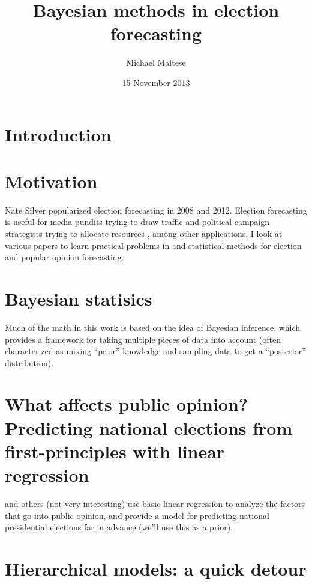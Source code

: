 \documentclass[12pt]{report}
\begin{document}
\title{\textbf{Bayesian methods in election forecasting}}
\author{Michael Maltese}
\date{15 November 2013}
\maketitle

\tableofcontents

\chapter*{Introduction}

\chapter{Motivation}

Nate Silver \citeyearpar{Silver:2012aa} popularized election forecasting in 2008 and 2012. Election forecasting is useful for media pundits trying to draw traffic and political campaign strategists trying to allocate resources \citep{Strauss:2007aa}, among other applications. I look at various papers to learn practical problems in and statistical methods for election and popular opinion forecasting.

\chapter{Bayesian statisics}

Much of the math in this work is based on the idea of Bayesian inference, which provides a framework for taking multiple pieces of data into account (often characterized as mixing ``prior'' knowledge and sampling data to get a ``posterior'' distribution).

\chapter{What affects public opinion? Predicting national elections from first-principles with linear regression}

\cite{Hibbs:2008aa} and others (not very interesting) use basic linear regression to analyze the factors that go into public opinion, and provide a model for predicting national presidential elections far in advance (we'll use this as a prior).

\chapter{Hierarchical models: a quick detour}
\end{document}
